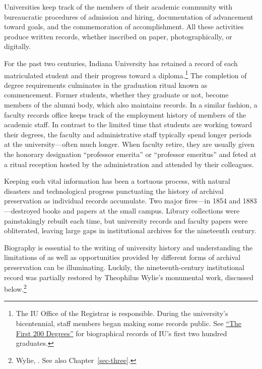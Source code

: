 \documentclass[
  american,
  letterpaper,
]{scrreprt}
\begin{document}
Universities keep track of the members of their academic community with
bureaucratic procedures of admission and hiring, documentation of
advancement toward goals, and the commemoration of accomplishment. All
these activities produce written records, whether inscribed on paper,
photographically, or digitally.

For the past two centuries, Indiana University has retained a record of
each matriculated student and their progress toward a
diploma.\footnote{The IU Office of the Registrar is responsible. During
  the university's bicentennial, staff members began making some records
  public. See \href{https://first200.iu.edu/index.html}{``The First 200
  Degrees''} for biographical records of IU's first two hundred
  graduates.} The completion of degree requirements culminates in the
graduation ritual known as commencement. Former students, whether they
graduate or not, become members of the alumni body, which also maintains
records. In a similar fashion, a faculty records office keeps track of
the employment history of members of the academic staff. In contrast to
the limited time that students are working toward their degrees, the
faculty and administrative staff typically spend longer periods at the
university---often much longer. When faculty retire, they are usually
given the honorary designation ``professor emerita'' or ``professor
emeritus'' and feted at a ritual reception hosted by the administration
and attended by their colleagues.

Keeping such vital information has been a tortuous process, with natural
disasters and technological progress punctuating the history of archival
preservation as individual records accumulate. Two major fires---in 1854
and 1883---destroyed books and papers at the small campus. Library
collections were painstakingly rebuilt each time, but university records
and faculty papers were obliterated, leaving large gaps in institutional
archives for the nineteenth century.

Biography is essential to the writing of university history and
understanding the limitations of as well as opportunities provided by
different forms of archival preservation can be illuminating. Luckily,
the nineteenth-century institutional record was partially restored by
Theophilus Wylie's monumental work, discussed below.\footnote{Wylie,
  . See also Chapter~\ref{sec-three}.}
\end{document}

